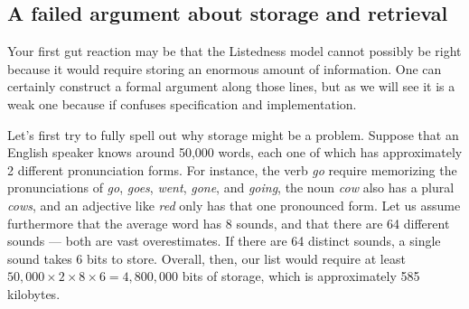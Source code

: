\subsection{A failed argument about storage and retrieval}
\label{ssec:listphonology_inadequacy_storage}

Your first gut reaction may be that the Listedness model cannot possibly be right because it would require storing an enormous amount of information.
One can certainly construct a formal argument along those lines, but as we will see it is a weak one because if confuses specification and implementation.

Let's first try to fully spell out why storage might be a problem.
Suppose that an English speaker knows around 50,000 words, each one of which has approximately 2 different pronunciation forms.
For instance, the verb \emph{go} require memorizing the pronunciations of 
\emph{go}, \emph{goes}, \emph{went}, \emph{gone}, and \emph{going},
the noun \emph{cow} also has a plural \emph{cows},
and an adjective like \emph{red} only has that one pronounced form.
Let us assume furthermore that the average word has 8 sounds, and that there are 64 different sounds --- both are vast overestimates.
If there are 64 distinct sounds, a single sound takes 6 bits to store.
Overall, then, our list would require at least
$
50,000
\times
2
\times
8
\times
6
=
4,800,000
$
bits of storage, which is approximately 585 kilobytes.

